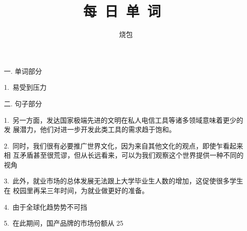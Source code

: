 \documentclass[a4paper, 12pt]{article}
\begin{document}
    \noindent

    \title{ 每\ 日\ 单\ 词\  }
    \author{ 烧包 }
    \maketitle

\begin{flushleft}
一. 单词部分
\end{flushleft}

\begin{multicols}{2}
\begin{flushleft}
1.\ 易受到压力 \ \ \ \ \underline{\hspace{3cm}}
\end{flushleft}
\end{multicols}

\begin{flushleft}
二. 句子部分
\end{flushleft}

\begin{flushleft}
1.\ 另一方面，发达国家极端先进的文明在私人电信工具等诸多领域意味着更少的发 展潜力，他们对进一步开发此类工具的需求趋于饱和。

\underline{\hspace{16cm}}
\end{flushleft}

\begin{flushleft}
2.\ 同时，我们很有必要推广世界文化，因为来自其他文化的观点，即使乍看起来相 互矛盾甚至很荒谬，但从长远看来，可以为我们观察这个世界提供一种不同的视角

\underline{\hspace{16cm}}
\end{flushleft}

\begin{flushleft}
3.\ 此外，就业市场的总体发展无法跟上大学毕业生人数的增加，这促使很多学生在 校园里再呆三年时间，为就业做更好的准备。

\underline{\hspace{16cm}}
\end{flushleft}

\begin{flushleft}
4.\ 由于全球化趋势势不可挡

\underline{\hspace{16cm}}
\end{flushleft}

\begin{flushleft}
5.\ 在此期间，国产品牌的市场份额从 25%

\underline{\hspace{16cm}}
\end{flushleft}
\end{document}
